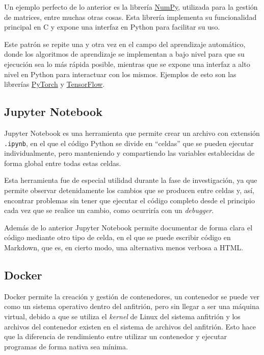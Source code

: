 Un ejemplo perfecto de lo anterior es la librería
\href{https://github.com/numpy/numpy}{NumPy}, utilizada para la gestión de
matrices, entre muchas otras cosas. Esta librería implementa su funcionalidad
principal en C y expone una interfaz en Python para facilitar su uso.

Este patrón se repite una y otra vez en el campo del aprendizaje automático,
donde los algoritmos de aprendizaje se implementan a bajo nivel para que su
ejecución sea lo más rápida posible, mientras que se expone una interfaz a alto
nivel en Python para interactuar con los mismos. Ejemplos de esto son las
librerías \href{https://github.com/pytorch/pytorch}{PyTorch} y
\href{https://github.com/tensorflow/tensorflow}{TensorFlow}.

\subsection{Jupyter Notebook}

Jupyter Notebook es una herramienta que permite crear un archivo con extensión
\texttt{.ipynb}, en el que el código Python se divide en ``celdas'' que se
pueden ejecutar individualmente, pero manteniendo y compartiendo las variables
establecidas de forma global entre todas estas celdas.

Esta herramienta fue de especial utilidad durante la fase de investigación, ya
que permite observar detenidamente los cambios que se producen entre celdas y,
así, encontrar problemas sin tener que ejecutar el código completo desde el
principio cada vez que se realice un cambio, como ocurriría con un
\textit{debugger}.

Además de lo anterior Jupyter Notebook permite documentar de forma clara el
código mediante otro tipo de celda, en el que se puede escribir código en
Markdown, que es, en cierto modo, una alternativa menos verbosa a HTML.

\subsection{Docker}

Docker permite la creación y gestión de contenedores, un contenedor se puede ver
como un sistema operativo dentro del anfitrión, pero sin llegar a ser una
máquina virtual, debido a que se utiliza el \textit{kernel} de Linux del sistema
anfitrión y los archivos del contenedor existen en el sistema de archivos del
anfitrión. Esto hace que la diferencia de rendimiento entre utilizar un
contenedor y ejecutar programas de forma nativa sea mínima.

